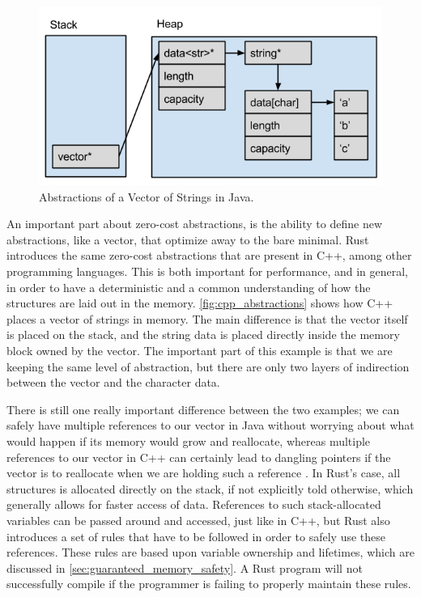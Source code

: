 \begin{figure}[tb]
  \begin{center}
    \includegraphics[scale=0.5]{figures/java_abstractions}
  \end{center}
  \caption{Abstractions of a Vector of Strings in Java.}
  \label{fig:java_abstractions}
\end{figure}

An important part about zero-cost abstractions, is the ability to define new abstractions, like a vector, that optimize away to the bare minimal.
Rust introduces the same zero-cost abstractions that are present in C++, among other programming languages.
This is both important for performance, and in general, in order to have a deterministic and a common understanding of how the structures are laid out in the memory.
\autoref{fig:cpp_abstractions} shows how C++ places a vector of strings in memory.
The main difference is that the vector itself is placed on the stack, and the string data is placed directly inside the memory block owned by the vector.
The important part of this example is that we are keeping the same level of abstraction, but there are only two layers of indirection between the vector and the character data.

There is still one really important difference between the two examples; we can safely have multiple references to our vector in Java without worrying about what would happen if its memory would grow and reallocate, whereas multiple references to our vector in C++ can certainly lead to dangling pointers if the vector is to reallocate when we are holding such a reference
.
In Rust's case, all structures is allocated directly on the stack, if not explicitly told otherwise, which generally allows for faster access of data.
References to such stack-allocated variables can be passed around and accessed, just like in C++,
but Rust also introduces a set of rules that have to be followed in order to safely use these references.
These rules are based upon variable ownership and lifetimes, which are discussed in \autoref{sec:guaranteed_memory_safety}.
A Rust program will not successfully compile if the programmer is failing to properly maintain these rules.

